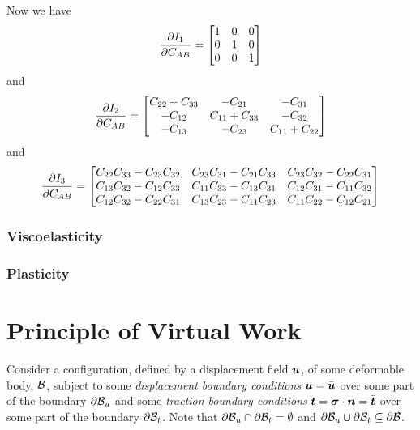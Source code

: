 Now we have
\begin{equation}
   \dfrac{\partial I_{1}}{\partial C_{AB}} =\begin{bmatrix}
    1 & 0 & 0 \\
    0 & 1 & 0 \\
    0 & 0 & 1
  \end{bmatrix}
\end{equation}
and
\begin{equation}
   \dfrac{\partial I_{2}}{\partial C_{AB}} =\begin{bmatrix}
    C_{22}+C_{33} & -C_{21} & -C_{31} \\
    -C_{12} & C_{11}+C_{33} & -C_{32} \\
    -C_{13} & -C_{23} & C_{11}+C_{22}
  \end{bmatrix}
\end{equation}
and
\begin{equation}
   \dfrac{\partial I_{3}}{\partial C_{AB}} =\begin{bmatrix}
    C_{22}C_{33}-C_{23}C_{32} & C_{23}C_{31}-C_{21}C_{33} & C_{23}C_{32}-C_{22}C_{31} \\
    C_{13}C_{32}-C_{12}C_{33} & C_{11}C_{33}-C_{13}C_{31} & C_{12}C_{31}-C_{11}C_{32} \\
    C_{12}C_{32}-C_{22}C_{31} & C_{13}C_{23}-C_{11}C_{23} & C_{11}C_{22}-C_{12}C_{21}
  \end{bmatrix}
\end{equation}

\subsubsection{Viscoelasticity}

\subsubsection{Plasticity}

\section{Principle of Virtual Work}

Consider a configuration, defined by a displacement field $ \boldsymbol{u} $, of some
deformable body, $ \mathcal{B} $, subject to some \emph{displacement
  boundary conditions} $ \boldsymbol{u} =\bar{ \boldsymbol{u} }$ over some part of the
boundary $ \partial{\ensuremath{ \mathcal{B} }} _{u}$ and some \emph{traction boundary
  conditions} $ \boldsymbol{t} = \boldsymbol{\mathit{\sigma}}  \cdot   \boldsymbol{n}  =\bar{ \boldsymbol{t} }$
over some part of the boundary $ \partial{\ensuremath{ \mathcal{B} }} _{t}$. Note that
$ \partial{\ensuremath{ \mathcal{B} }} _{u}\cap \partial{\ensuremath{ \mathcal{B} }} _{t}=\emptyset$
and
$ \partial{\ensuremath{ \mathcal{B} }} _{u}\cup \partial{\ensuremath{ \mathcal{B} }} _{t}\subseteq \partial{\ensuremath{ \mathcal{B} }} $.

